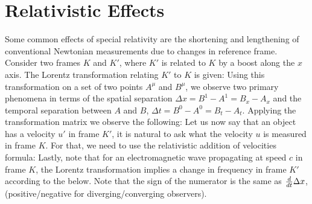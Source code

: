 \section{Relativistic Effects}
Some common effects of special relativity are the shortening and lengthening of conventional Newtonian measurements due to changes in reference frame. Consider two frames $K$ and $K'$, where $K'$ is related to $K$ by a boost along the $x$ axis. The Lorentz transformation relating $K'$ to $K$ is given:
Using this transformation on a set of two points $A^\mu$ and $B^\mu$, we observe two primary phenomena in terms of the spatial separation $\Delta x = B^1 - A^1 = B_x - A_x$ and the temporal separation between $A$ and $B$, $\Delta t = B^0 - A^0 = B_t - A_t$. Applying the transformation matrix we observe the following:
Let us now say that an object has a velocity $u'$ in frame $K'$, it is natural to ask what the velocity $u$ is measured in frame $K$. For that, we need to use the relativistic addition of velocities formula:
Lastly, note that for an electromagnetic wave propagating at speed $c$ in frame $K$, the Lorentz transformation implies a change in frequency in frame $K'$ according to the below. Note that the sign of the numerator is the same as $\frac{d }{dt}\Delta x$, (positive/negative for diverging/converging observers).

